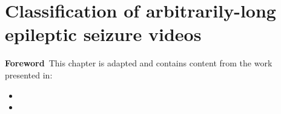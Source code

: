 \chapter[Classification of arbitrarily-long epileptic seizure videos]{Classification of arbitrarily-long epileptic seizure videos}

\label{chap:videos}

\minitoc

\acresetall
\begin{center}
  \begin{minipage}[b]{0.9\linewidth}
    \small
    \textbf{Foreword\,}
    This chapter is adapted and contains content from the work presented in:
    \begin{itemize}
      \item {}
      \item {}
    \end{itemize}
  \end{minipage}
\end{center}



\acresetall
\bodyspacing





\onehalfspacing %
